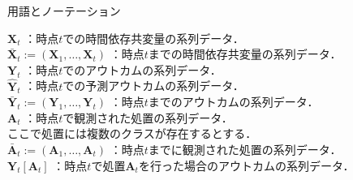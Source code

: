 \documentclass[dvipdfmx]{jreport}
\begin{document}
\begin{itembox}[l]{\large{用語とノーテーション}}
\begin{tabbing}
        \hspace{15pt} \raisebox{0.5ex}{\tiny $\bullet$} $\mathbf{X}_t$ \>：時点$t$での時間依存共変量の系列データ．\\[0.5em]
        \hspace{15pt} \raisebox{0.5ex}{\tiny $\bullet$} $\bar{\mathbf{X}}_t := (\mathbf{X}_1,\dots,\mathbf{X}_t)$ \>：時点$t$までの時間依存共変量の系列データ．\\[0.5em]
        \hspace{15pt} \raisebox{0.5ex}{\tiny $\bullet$} $\mathbf{Y}_t$ \>：時点$t$でのアウトカムの系列データ．\\[0.5em]
        \hspace{15pt} \raisebox{0.5ex}{\tiny $\bullet$} $\mathbf{\hat{Y}}_t$ \>：時点$t$での予測アウトカムの系列データ．\\[0.5em]
        \hspace{15pt} \raisebox{0.5ex}{\tiny $\bullet$} $\bar{\mathbf{Y}}_t := (\mathbf{Y}_1,\dots,\mathbf{Y}_t)$ \>：時点$t$までのアウトカムの系列データ．\\[0.5em]
        \hspace{15pt} \raisebox{0.5ex}{\tiny $\bullet$} $\mathbf{A}_{t}$ \>：時点$t$で観測された処置の系列データ．\\[0.5em]\>\hspace{6.5pt}ここで処置には複数のクラスが存在するとする．\\[0.5em]
        \hspace{15pt} \raisebox{0.5ex}{\tiny $\bullet$} $\bar{\mathbf{A}}_{t} := (\mathbf{A}_1,\dots,\mathbf{A}_{t})$ \>：時点$t$までに観測された処置の系列データ．\\[0.5em]
        \hspace{15pt} \raisebox{0.5ex}{\tiny $\bullet$} $\mathbf{Y}_t[\mathbf{A}_{t}]$ \>：時点$t$で処置$\mathbf{A}_{t}$を行った場合のアウトカムの系列データ．\\[0.5em]

\end{tabbing}
\end{itembox}
\end{document}
